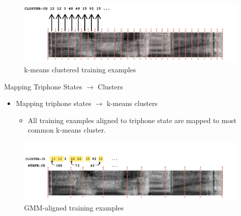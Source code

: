 \documentclass[final]{beamer} %
\begin{document}
\begin{frame}
\begin{columns}
\begin{column}{0.23\textwidth}
{        \vfill
        
        \begin{figure}[!htbp]
          \centering
          \includegraphics[width=\linewidth]{figs/clustered.png}
          \caption{k-means clustered training examples}
          \endminipage\hfill
        \end{figure}
        
        \vfill
        
        \begin{block}{\boxnumber Mapping Triphone States $\rightarrow$ Clusters}          
          \begin{itemize}
          \item Mapping triphone states $\rightarrow$ k-means clusters
            \begin{itemize}
            \item All training examples aligned to triphone state are mapped to most common k-means cluster.
            \end{itemize}
          \end{itemize}
        \end{block}

        \vfill
        
        \begin{figure}[!htbp]
          \centering
          \includegraphics[width=\linewidth]{figs/mapped.png}
          \caption{GMM-aligned training examples}
          \endminipage\hfill
        \end{figure}

        \vfill
        
      } %
    \end{column}


\end{columns}
\end{frame}
\end{document}
